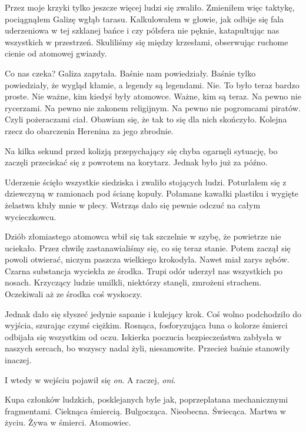 Przez moje krzyki tylko jeszcze więcej ludzi się zwaliło.
Zmieniłem więc taktykę, pociągnąłem Galizę wgłąb tarasu.
Kalkulowałem w głowie, jak odbije się fala uderzeniowa w tej szklanej bańce i czy półsfera nie pęknie, katapultując nas wszystkich w przestrzeń.
Skuliliśmy się między krzesłami, obserwując ruchome cienie od atomowej gwiazdy.

\begin{dialogue}
	\ds{} Co nas czeka? \dm{} Galiza zapytała.
	\ds{} Baśnie nam powiedziały.
	\ds{} Baśnie tylko powiedziały, że wygląd kłamie, a legendy są legendami.
	\ds{} Nie. \dm{} To było teraz bardzo proste. \dm{} Nie ważne, kim kiedyś były atomowce. Ważne, kim są teraz. Na pewno nie rycerzami. Na pewno nie zakonem religijnym. Na pewno nie pogromcami piratów.
	\ds{} Czyli pożeraczami ciał.
	\ds{} Obawiam się, że tak to się dla nich skończyło.
	\ds{} Kolejna rzecz do obarczenia Herenina za jego zbrodnie.
\end{dialogue}

Na kilka sekund przed kolizją przepychający się chyba ogarnęli sytuację, bo zaczęli przeciskać się z powrotem na korytarz.
Jednak było już za późno.

Uderzenie ścięło wszystkie siedziska i zwaliło stojących ludzi.
Poturlałem się z dziewczyną w ramionach pod ścianę kopuły.
Połamane kawałki plastiku i wygięte żelastwa kłuły mnie w plecy.
Wstrząs dało się pewnie odczuć na całym wycieczkowcu.

Dziób złomiastego atomowca wbił się tak szczelnie w szybę, że powietrze nie uciekało.
Przez chwilę zastanawialiśmy się, co się teraz stanie.
Potem zaczął się powoli otwierać, niczym paszcza wielkiego krokodyla.
Nawet miał zarys zębów.
Czarna substancja wyciekła ze środka.
Trupi odór uderzył nas wszystkich po nosach.
Krzyczący ludzie umilkli, niektórzy stanęli, zmrożeni strachem.
Oczekiwali aż ze środka coś wyskoczy.

Jednak dało się słyszeć jedynie sapanie i kulejący krok.
Coś wolno podchodziło do wyjścia, szurając czymś ciężkim.
Rosnąca, fosforyzująca łuna o kolorze śmierci odbijała się wszystkim od oczu.
Iskierka poczucia bezpieczeństwa zabłysła w naszych sercach, bo wszyscy nadal żyli, niesamowite.
Przecież baśnie stanowiły inaczej.

I wtedy w wejściu pojawił się \emph{on}.
A raczej, \emph{oni}.

Kupa członków ludzkich, posklejanych byle jak, poprzeplatana mechanicznymi fragmentami.
Cieknąca śmiercią.
Bulgocząca.
Nieobecna.
Świecąca.
Martwa w życiu.
Żywa w śmierci.
Atomowiec.

